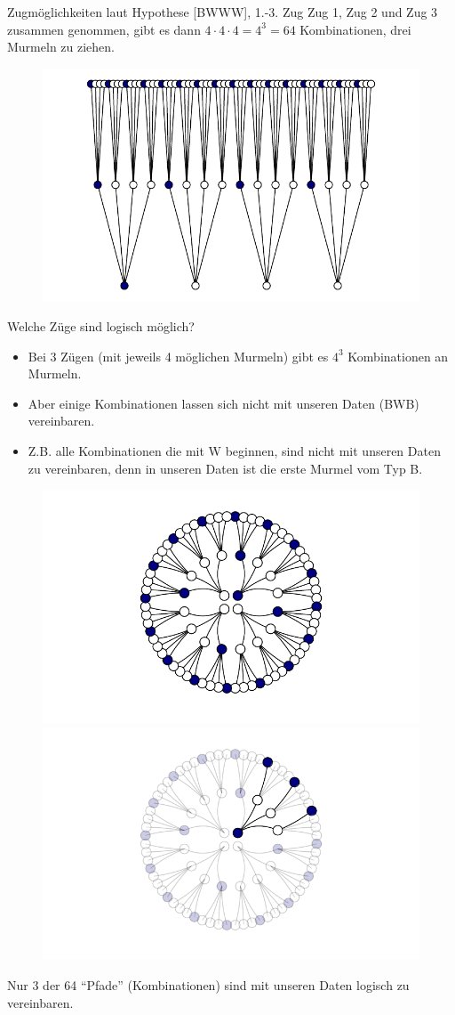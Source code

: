 \documentclass[
  ngerman,
  ignorenonframetext,
]{beamer}
\providecommand{\tightlist}{%
  \setlength{\itemsep}{0pt}\setlength{\parskip}{0pt}}
\begin{document}
\begin{frame}{Zugmöglichkeiten laut Hypothese {[}BWWW{]}, 1.-3. Zug}
\protect\hypertarget{zugmuxf6glichkeiten-laut-hypothese-bwww-1.-3.-zug}{}
Zug 1, Zug 2 und Zug 3 zusammen genommen, gibt es dann
\(4\cdot4\cdot4=4^3=64\) Kombinationen, drei Murmeln zu ziehen.

\begin{figure}[H]
\includegraphics[width=0.5\linewidth]{unnamed-chunk-7-1} \end{figure}
\end{frame}

\begin{frame}{Welche Züge sind logisch möglich?}
\protect\hypertarget{welche-zuxfcge-sind-logisch-muxf6glich}{}
\begin{itemize}
\tightlist
\item
  Bei 3 Zügen (mit jeweils 4 möglichen Murmeln) gibt es \(4^3\)
  Kombinationen an Murmeln.
\item
  Aber einige Kombinationen lassen sich nicht mit unseren Daten (BWB)
  vereinbaren.
\item
  Z.B. alle Kombinationen die mit W beginnen, sind nicht mit unseren
  Daten zu vereinbaren, denn in unseren Daten ist die erste Murmel vom
  Typ B.
\end{itemize}

\begin{figure}[H]
\includegraphics[width=0.49\linewidth]{unnamed-chunk-8-1} \includegraphics[width=0.49\linewidth]{unnamed-chunk-8-2} \end{figure}

Nur 3 der 64 ``Pfade'' (Kombinationen) sind mit unseren Daten logisch zu
vereinbaren.
\end{frame}
\end{document}
